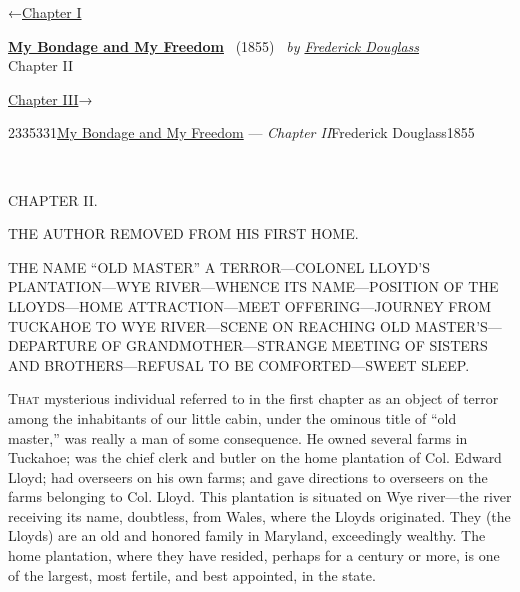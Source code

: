 \hypertarget{headerContainer}{}
\hypertarget{navigationHeader}{}
\protect\hypertarget{headerprevious}{}{←\href{/wiki/My_Bondage_and_My_Freedom_(1855)/Chapter_I}{Chapter
I}}

\textbf{\protect\hypertarget{header_title_text}{}{\href{/wiki/My_Bondage_and_My_Freedom_(1855)}{My
Bondage and My Freedom}}} ~(1855)~ \emph{by
\href{/wiki/Author:Frederick_Douglass}{\protect\hypertarget{header_author_text}{}{{Frederick
Douglass}}}}\\
\protect\hypertarget{header_section_text}{}{Chapter II}

\protect\hypertarget{headernext}{}{\href{/wiki/My_Bondage_and_My_Freedom_(1855)/Chapter_III}{Chapter
III}→}

\hypertarget{navigationNotes}{}

\hypertarget{ws-data}{}
\protect\hypertarget{ws-article-id}{}{2335331}\protect\hypertarget{ws-title}{}{\href{/wiki/My_Bondage_and_My_Freedom_(1855)}{My
Bondage and My Freedom} --- \emph{Chapter
II}}\protect\hypertarget{ws-author}{}{Frederick
Douglass}\protect\hypertarget{ws-year}{}{1855}

{\protect\hypertarget{43}{}{}}

~

{CHAPTER II.}

THE AUTHOR REMOVED FROM HIS FIRST HOME.

{THE NAME ``OLD MASTER'' A TERROR---COLONEL LLOYD'S PLANTATION---WYE
RIVER---WHENCE ITS NAME---POSITION OF THE LLOYDS---HOME
ATTRACTION---MEET OFFERING---JOURNEY FROM TUCKAHOE TO WYE RIVER---SCENE
ON REACHING OLD MASTER'S---DEPARTURE OF GRANDMOTHER---STRANGE MEETING OF
SISTERS AND BROTHERS---REFUSAL TO BE COMFORTED---SWEET SLEEP.}

\textsc{That} mysterious individual referred to in the first chapter as
an object of terror among the inhabitants of our little cabin, under the
ominous title of ``old master,'' was really a man of some consequence.
He owned several farms in Tuckahoe; was the chief clerk and butler on
the home plantation of Col. Edward Lloyd; had overseers on his own
farms; and gave directions to overseers on the farms belonging to Col.
Lloyd. This plantation is situated on Wye river---the river receiving
its name, doubtless, from Wales, where the Lloyds originated. They (the
Lloyds) are an old and honored family in Maryland, exceedingly wealthy.
The home plantation, where they have resided, perhaps for a century or
more, is one of the largest, most fertile, and best appointed, in the
state.


